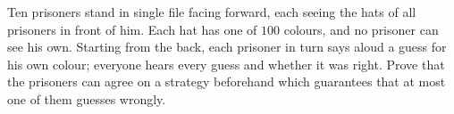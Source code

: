 Ten prisoners stand in single file facing forward, each seeing the hats of all prisoners in front of him. Each hat has one of $100$ colours, and no prisoner can see his own. Starting from the back, each prisoner in turn says aloud a guess for his own colour; everyone hears every guess and whether it was right. Prove that the prisoners can agree on a strategy beforehand which guarantees that at most one of them guesses wrongly.
